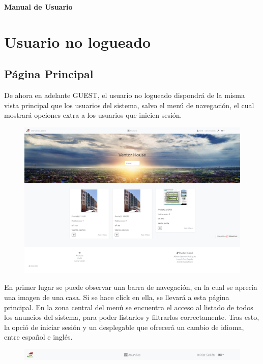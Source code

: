 \newpage{\pagestyle{empty}\cleardoublepage}
\newpage
\vspace*{\fill}
    \begin{center}
      \thispagestyle{empty} \vspace*{0cm} \textbf{\huge
Manual de Usuario}
    \end{center}
    \vspace*{\fill}
\newpage{\pagestyle{empty}\cleardoublepage}
\chapter{Usuario no logueado}

\section{P\'{a}gina Principal}
De ahora en adelante GUEST, el usuario no logueado dispondr\'{a} de la misma vista principal que los usuarios del sistema, salvo el men\'{u} de navegaci\'{o}n, el cual mostrar\'{a} opciones extra a los usuarios que inicien sesi\'{o}n.\\

\begin{figure}[h!]
\centering
\includegraphics[width=.7\textwidth]{Img/ManualUsuario/PPAL_GUEST.jpg}
\end{figure}

En primer lugar se puede observar una barra de navegaci\'{o}n, en la cual se aprecia una imagen de una casa. Si se hace click en ella, se llevar\'{a} a esta p\'{a}gina principal. En la zona central del men\'{u} se encuentra el acceso al listado de todos los anuncios del sistema, para poder listarlos y filtrarlos correctamente. Tras esto, la opci\'{o} de iniciar sesi\'{o}n y un desplegable que ofrecer\'{a} un cambio de idioma, entre espa\~{n}ol e ingl\'{e}s.

\begin{figure}[h!]
\centering
\includegraphics[width=1\textwidth]{Img/ManualUsuario/NAV_GUEST.png}
\end{figure}


